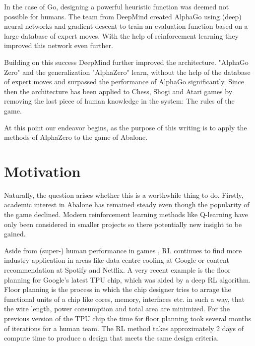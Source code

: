 In the case of Go, designing a powerful heuristic function was deemed not possible for humans. The team from DeepMind created AlphaGo using (deep) neural networks and gradient descent to train an evaluation function based on a large database of expert moves. With the help of reinforcement learning they improved this network even further.  \cite{silver_mastering_2017}

Building on this success DeepMind further improved the architecture. "AlphaGo Zero" and the generalization "AlphaZero" learn, without the help of the database of expert moves and surpassed the performance of AlphaGo significantly. Since then the architecture has been applied to Chess, Shogi and Atari games by removing the last piece of human knowledge in the system: The rules of the game. \cite{schrittwieser_mastering_2020}

At this point our endeavor begins, as the purpose of this writing is to apply the methods of AlphaZero to the game of Abalone.

\section{Motivation}
Naturally, the question arises whether this is a worthwhile thing to do. Firstly, academic interest in Abalone has remained steady even though the popularity of the game declined. Modern reinforcement learning methods like Q-learning have only been considered in smaller projects \cite{mizrachi_introduction_2017} so there potentially new insight to be gained.

Aside from (super-) human performance in games \cite{mnih_human-level_2015, berner_dota_2019,vinyals_grandmaster_2019}, RL continues to find more industry application in areas like data centre cooling at Google \cite{gamble_safety-first_2018} or content recommendation at Spotify \cite{jebara_for_2020} and Netflix. \cite{siddiqi_ml_2019}
A very recent example is the floor planning for Google's latest TPU chip, which was aided by a deep RL algorithm. Floor planning is the process in which the chip designer tries to arrage the functional units of a chip like cores, memory, interfaces etc. in such a way, that the wire length, power consumption and total area are minimized. For the previous version of the TPU chip the time for floor planning took several months of iterations for a human team. The RL method takes approximately 2 days of compute time to produce a design that meets the same design criteria. \cite{mirhoseini_graph_2021}


